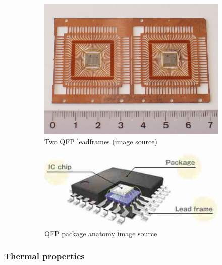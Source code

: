 \documentclass[final]{cubedoc}
\begin{document}
	\begin{figure}[h!]
		\centering
		\begin{subfigure}{.5\textwidth}
			\centering
			\includegraphics[keepaspectratio, width=0.7\linewidth]{docs/leadframe_qfp.jpg}
			\caption{Two QFP leadframes \small{(\href{https://web.archive.org/web/20200818153249/https://commons.wikimedia.org/wiki/File:TQFP_Leadframe.jpg}{image source})}}
			\label{fig:sub1}
		\end{subfigure}%
		\begin{subfigure}{.5\textwidth}
			\centering
			\includegraphics[keepaspectratio, width=\linewidth, height=.6\textheight]{docs/qfp_anatomy.jpg}
			\caption{QFP package anatomy \small{\href{https://web.archive.org/web/20200818153744/http://resource.renesas.com/lib/eng/fab/index.html}{image source}}}
			\label{fig:sub2}
		\end{subfigure}
		\caption{}
		\label{fig:test}
	\end{figure}
	
	\subsubsection{Thermal properties}
	
\end{document}
